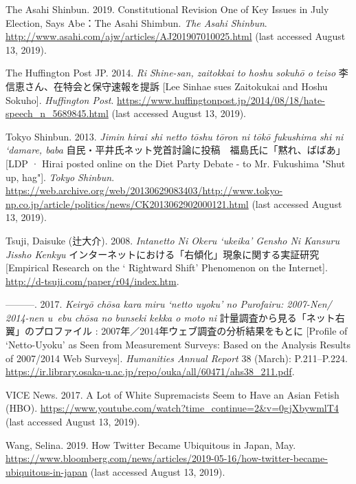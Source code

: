 \documentclass[10pt,british,A4paper,oneside]{memoir}
\begin{document}
\hypertarget{ref-the_asahi_shimbun_constitutional_2019}{}
The Asahi Shinbun. 2019. Constitutional Revision One of Key Issues in
July Election, Says Abe：The Asahi Shimbun. \emph{The Asahi Shinbun}.
\url{http://www.asahi.com/ajw/articles/AJ201907010025.html} (last accessed August 13, 2019).

\hypertarget{ref-the_huffington_post_jp_lee_2014}{}
The Huffington Post JP. 2014. \emph{Ri Shine-san, zaitokkai to hoshu sokuhō o teiso} 李信恵さん、在特会と保守速報を提訴 [Lee Sinhae sues Zaitokukai and Hoshu Sokuho]. \emph{Huffington Post}.
\url{https://www.huffingtonpost.jp/2014/08/18/hate-speech_n_5689845.html} (last accessed August 13, 2019).


\hypertarget{ref-tokyo_shimbun_tokyo_2013}{}
Tokyo Shinbun. 2013. \emph{Jimin hirai shi netto tōshu tōron ni tōkō fukushima shi ni `damare, baba} 自民・平井氏ネット党首討論に投稿　福島氏に「黙れ、ばばあ」 [LDP · Hirai posted online on the Diet Party Debate - to Mr. Fukushima "Shut up, hag"]. \emph{Tokyo Shinbun}.
\url{https://web.archive.org/web/20130629083403/http://www.tokyo-np.co.jp/article/politics/news/CK2013062902000121.html} (last accessed August 13, 2019).


\hypertarget{ref-tsuji_eng:_2008}{}
Tsuji, Daisuke (辻大介). 2008. \emph{Intanetto Ni Okeru ‘ukeika’ Gensho Ni Kansuru Jissho Kenkyu} インターネットにおける「右傾化」現象に関する実証研究 [Empirical Research on the ` Rightward Shift' Phenomenon on the Internet]. 
\url{http://d-tsuji.com/paper/r04/index.htm}.

\hypertarget{ref-tsuji_eng._2017}{}
---------. 2017. \emph{Keiryō chōsa kara miru `netto uyoku' no Purofairu: 2007-Nen/ 2014-nen u~ebu chōsa no bunseki kekka o moto ni} 計量調査から見る「ネット右翼」のプロファイル : 2007年／2014年ウェブ調査の分析結果をもとに [Profile of `Netto-Uyoku' as Seen from Measurement Surveys: Based on the Analysis Results of 2007/2014 Web Surveys].
\emph{Humanities Annual Report} 38 (March): P.211--P.224.
\url{https://ir.library.osaka-u.ac.jp/repo/ouka/all/60471/ahs38_211.pdf}.

\hypertarget{ref-vice_news_lot_2017}{}
VICE News. 2017. A Lot of White Supremacists Seem to Have an Asian
Fetish (HBO).
\url{https://www.youtube.com/watch?time_continue=2\&v=0gjXbywmlT4} (last accessed August 13, 2019).

\hypertarget{ref-wang_how_2019}{}
Wang, Selina. 2019. How Twitter Became Ubiquitous in Japan, May.
\url{https://www.bloomberg.com/news/articles/2019-05-16/how-twitter-became-ubiquitous-in-japan} (last accessed August 13, 2019).
\end{document}
